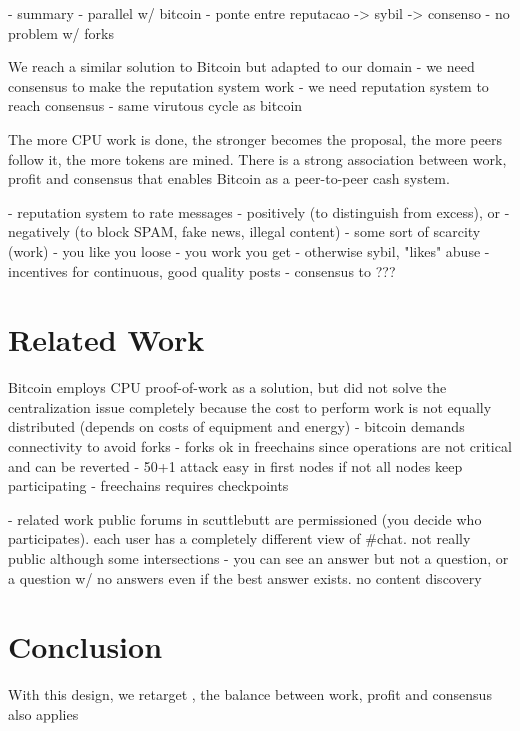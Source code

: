 \documentclass[10pt,journal,compsoc]{IEEEtran}
\begin{document}
- summary
    - parallel w/ bitcoin
        - ponte entre reputacao -> sybil -> consenso
    - no problem w/ forks

We reach a similar solution to Bitcoin but adapted to our domain
- we need consensus to make the reputation system work
- we need reputation system to reach consensus
- same virutous cycle as bitcoin

The more CPU work is done, the stronger becomes the proposal, the more peers
follow it, the more tokens are mined.
There is a strong association between work, profit and consensus that enables
Bitcoin as a peer-to-peer cash system.

- reputation system to rate messages
    - positively (to distinguish from excess), or
    - negatively (to block SPAM, fake news, illegal content)
- some sort of scarcity (work)
    - you like you loose
    - you work you get
    - otherwise sybil, "likes" abuse
    - incentives for continuous, good quality posts
- consensus to ???

\section{Related Work}
\label{sec.related}

Bitcoin employs CPU proof-of-work as a solution, but did not solve the
centralization issue completely because the cost to perform work is not
equally distributed
(depends on costs of equipment and energy)
    - bitcoin demands connectivity to avoid forks
    - forks ok in freechains since operations are not critical and can be reverted
    - 50+1 attack easy in first nodes if not all nodes keep participating
        - freechains requires checkpoints

- related work public forums in scuttlebutt are permissioned (you decide who
  participates). each user has a completely different view of \#chat. not really
  public although some intersections
    - you can see an answer but not a question, or a question w/ no answers
      even if the best answer exists. no content discovery



\section{Conclusion}
\label{sec.conclusion}



With this design, we retarget  , the balance between work, profit and consensus also applies 
\end{document}
